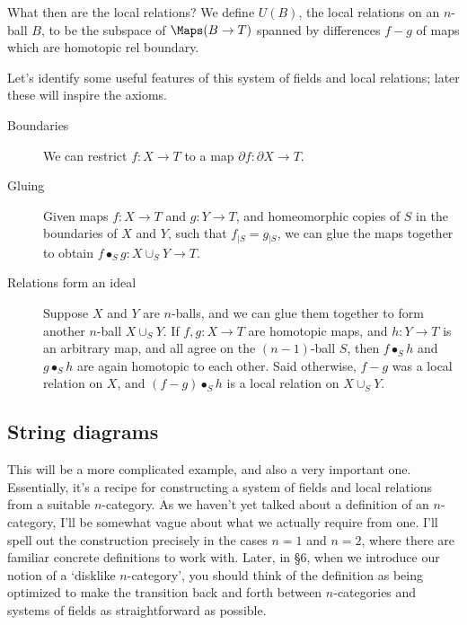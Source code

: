 \documentclass[11pt]{amsart}
\theoremstyle{plain}
\newcommand{\bdy}{\partial}
\newcommand{\restrict}[2]{#1{}_{\mid #2}{}}
\begin{document}
What then are the local relations? We define $U(B)$, the local relations on an $n$-ball $B$, to be the subspace of $\Maps(B \to T)$ spanned by differences $f-g$ of maps which are homotopic rel boundary.

Let's identify some useful features of this system of fields and local relations; later these will inspire the axioms.

\begin{description}
\item[Boundaries] We can restrict $f: X \to T$ to a map $\bdy f: \bdy X \to T$.
\item[Gluing] Given maps $f: X \to T$ and $g: Y \to T$, and homeomorphic copies of $S$ in the boundaries of $X$ and $Y$, such that $\restrict{f}{S} = \restrict{g}{S}$, we can glue the maps together to obtain $f \bullet_S g : X \cup_S Y \to T$.
\item[Relations form an ideal]
Suppose $X$ and $Y$ are $n$-balls, and we can glue them together to form another $n$-ball $X \cup_S Y$.
If $f, g: X \to T$ are homotopic maps, and $h: Y \to T$ is an arbitrary map, and all agree on the $(n-1)$-ball $S$, then $f \bullet_S h$ and $g \bullet_S h$ are again homotopic to each other. Said otherwise, $f-g$ was a local relation on $X$, and $(f-g) \bullet_S h$ is a local relation on $X \cup_S Y$.
\end{description}

\subsection{String diagrams}
This will be a more complicated example, and also a very important one. Essentially, it's a recipe for constructing a system of fields and local relations from a suitable $n$-category. As we haven't yet talked about a definition of an $n$-category, I'll be somewhat vague about what we actually require from one. I'll spell out the construction precisely in the cases $n=1$ and $n=2$, where there are familiar concrete definitions to work with. Later, in \S 6, when we introduce our notion of a `disklike $n$-category', you should think of the definition as being optimized to make the transition back and forth between $n$-categories and systems of fields as straightforward as possible.
\end{document}
